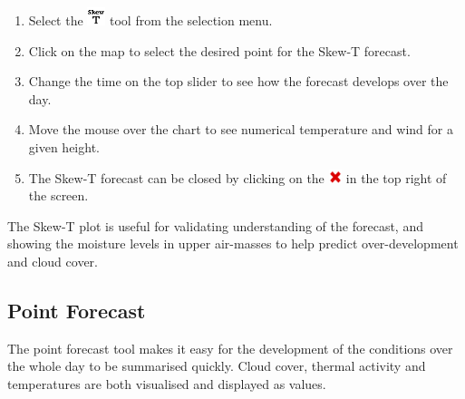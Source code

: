 \documentclass[11pt,a4paper]{article}
\begin{document}
\begin{enumerate}
\item Select the \includegraphics[height=15pt]{images/icons/skew-t.png} tool from the selection menu.
\item Click on the map to select the desired point for the Skew-T forecast.
\item Change the time on the top slider to see how the forecast develops over the day.
\item Move the mouse over the chart to see numerical temperature and wind for a given height.
\item The Skew-T forecast can be closed by clicking on the \includegraphics[height=11pt]{images/icons/exit.png} in the top right of the screen.
\end{enumerate}
\begin{tip}
\item The Skew-T plot is useful for validating understanding of the forecast, and showing the moisture levels in upper air-masses to help predict over-development and cloud cover.
\end{tip}
\subsection{Point Forecast}
The point forecast tool makes it easy for the development of the conditions over the whole day to be summarised quickly. Cloud cover, thermal activity and temperatures are both visualised and displayed as values.
\end{document}
